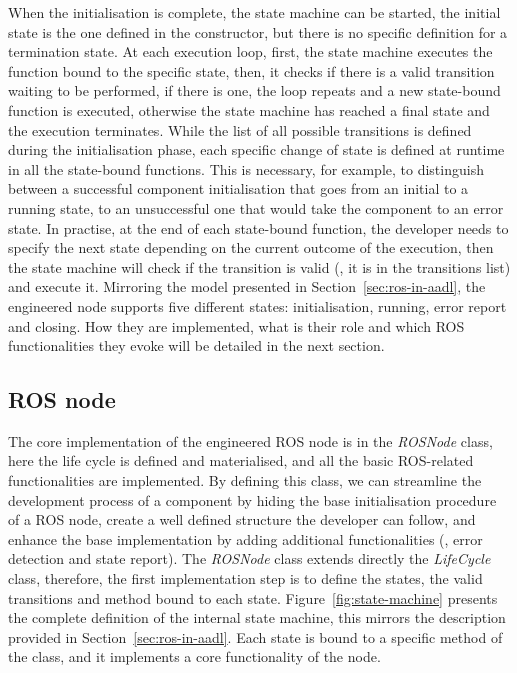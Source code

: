 When the initialisation is complete, the state machine can be started, the initial state is the one defined in the constructor, but there is no specific definition for a termination state. At each execution loop, first, the state machine executes the function bound to the specific state, then, it checks if there is a valid transition waiting to be performed, if there is one, the loop repeats and a new state-bound function is executed, otherwise the state machine has reached a final state and the execution terminates. While the list of all possible transitions is defined during the initialisation phase, each specific change of state is defined at runtime in all the state-bound functions. This is necessary, for example, to distinguish between a successful component initialisation that goes from an initial to a running state, to an unsuccessful one that would take the component to an error state. In practise, at the end of each state-bound function, the developer needs to specify the next state depending on the current outcome of the execution, then the state machine will check if the transition is valid (\ie, it is in the transitions list) and execute it. Mirroring the model presented in Section~\ref{sec:ros-in-aadl}, the engineered node supports five different states: initialisation, running, error report and closing. How they are implemented, what is their role and which ROS functionalities they evoke will be detailed in the next section.

\subsection{ROS node}
The core implementation of the engineered ROS node is in the \textit{ROSNode} class, here the life cycle is defined and materialised, and all the basic ROS-related functionalities are implemented. By defining this class, we can streamline the development process of a component by hiding the base initialisation procedure of a ROS node, create a well defined structure the developer can follow, and enhance the base implementation by adding additional functionalities (\eg, error detection and state report). The \textit{ROSNode} class extends directly the \textit{LifeCycle} class, therefore, the first implementation step is to define the states, the valid transitions and method bound to each state. Figure~\ref{fig:state-machine} presents the complete definition of the internal state machine, this mirrors the description provided in Section~\ref{sec:ros-in-aadl}. Each state is bound to a specific method of the class, and it implements a core functionality of the node.

